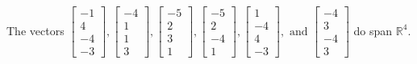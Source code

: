 \begin{exercise}
\begin{exerciseStatement}
  \end{exerciseStatement}
  \begin{exerciseAnswer}
   The vectors \(\left[\begin{array}{r}
-1 \\
4 \\
-4 \\
-3
\end{array}\right] , \left[\begin{array}{r}
-4 \\
1 \\
1 \\
3
\end{array}\right] , \left[\begin{array}{r}
-5 \\
2 \\
3 \\
1
\end{array}\right] , \left[\begin{array}{r}
-5 \\
2 \\
-4 \\
1
\end{array}\right] , \left[\begin{array}{r}
1 \\
-4 \\
4 \\
-3
\end{array}\right] , \text{ and } \left[\begin{array}{r}
-4 \\
3 \\
-4 \\
3
\end{array}\right]\) 
  	 do  
	span \(\mathbb{R}^4\).
  


  \end{exerciseAnswer}
\end{exercise}